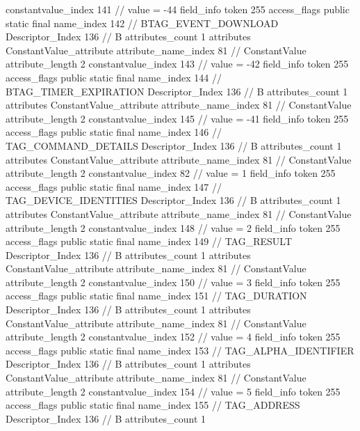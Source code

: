 {{{{{{{					constantvalue_index	141		// value = -44
				}
				}
			}
			field_info {
				token	255
				access_flags	public static final
				name_index	142		// BTAG_EVENT_DOWNLOAD
				Descriptor_Index	136		// B
				attributes_count	1
				attributes {
				ConstantValue_attribute {
					attribute_name_index	81		// ConstantValue
					attribute_length	2
					constantvalue_index	143		// value = -42
				}
				}
			}
			field_info {
				token	255
				access_flags	public static final
				name_index	144		// BTAG_TIMER_EXPIRATION
				Descriptor_Index	136		// B
				attributes_count	1
				attributes {
				ConstantValue_attribute {
					attribute_name_index	81		// ConstantValue
					attribute_length	2
					constantvalue_index	145		// value = -41
				}
				}
			}
			field_info {
				token	255
				access_flags	public static final
				name_index	146		// TAG_COMMAND_DETAILS
				Descriptor_Index	136		// B
				attributes_count	1
				attributes {
				ConstantValue_attribute {
					attribute_name_index	81		// ConstantValue
					attribute_length	2
					constantvalue_index	82		// value = 1
				}
				}
			}
			field_info {
				token	255
				access_flags	public static final
				name_index	147		// TAG_DEVICE_IDENTITIES
				Descriptor_Index	136		// B
				attributes_count	1
				attributes {
				ConstantValue_attribute {
					attribute_name_index	81		// ConstantValue
					attribute_length	2
					constantvalue_index	148		// value = 2
				}
				}
			}
			field_info {
				token	255
				access_flags	public static final
				name_index	149		// TAG_RESULT
				Descriptor_Index	136		// B
				attributes_count	1
				attributes {
				ConstantValue_attribute {
					attribute_name_index	81		// ConstantValue
					attribute_length	2
					constantvalue_index	150		// value = 3
				}
				}
			}
			field_info {
				token	255
				access_flags	public static final
				name_index	151		// TAG_DURATION
				Descriptor_Index	136		// B
				attributes_count	1
				attributes {
				ConstantValue_attribute {
					attribute_name_index	81		// ConstantValue
					attribute_length	2
					constantvalue_index	152		// value = 4
				}
				}
			}
			field_info {
				token	255
				access_flags	public static final
				name_index	153		// TAG_ALPHA_IDENTIFIER
				Descriptor_Index	136		// B
				attributes_count	1
				attributes {
				ConstantValue_attribute {
					attribute_name_index	81		// ConstantValue
					attribute_length	2
					constantvalue_index	154		// value = 5
				}
				}
			}
			field_info {
				token	255
				access_flags	public static final
				name_index	155		// TAG_ADDRESS
				Descriptor_Index	136		// B
				attributes_count	1
}}}}}
